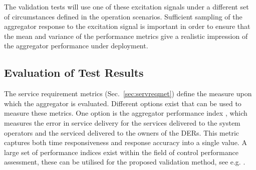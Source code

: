 The validation tests will use one of these excitation signals under a different set of circumstances defined in the operation scenarios. Sufficient sampling of the aggregator response to the excitation signal is important in order to ensure that the mean and variance of the performance metrics give a realistic impression of the aggregator performance under deployment.%





\subsection{Evaluation of Test Results}\label{sec:evaluation}
The service requirement metrics (Sec.~\ref{sec:servreqmet}) define the measure upon which the aggregator is evaluated. Different options exist that can be used to measure these metrics. One option is the aggregator performance index \cite{bondy2014performance}, which measures the error in service delivery for the services delivered to the system operators and the serviced delivered to the owners of the DERs. This metric captures both time responsiveness and response accuracy into a single value. A large set of performance indices exist within the field of control performance assessment, these can be utilised for the proposed validation method, see e.g. \cite{jelali2006overview}.

